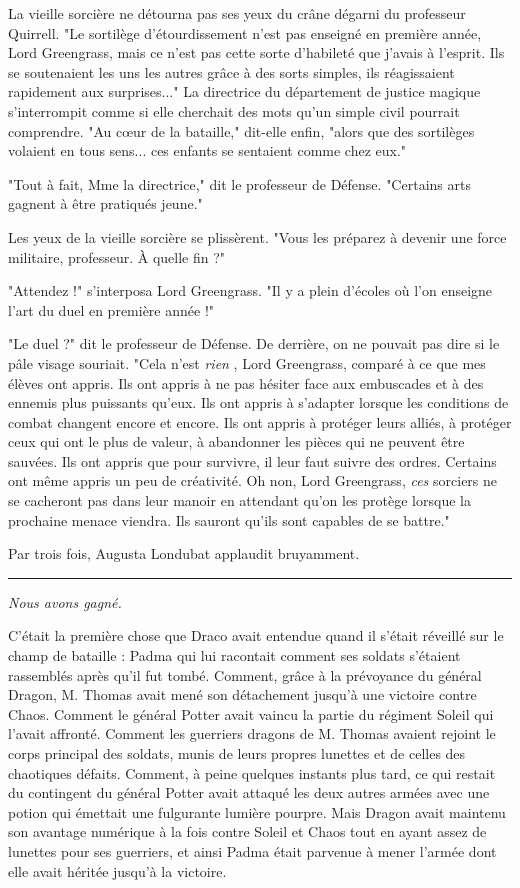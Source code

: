 La vieille sorcière ne détourna pas ses yeux du crâne dégarni du professeur Quirrell. "Le sortilège d'étourdissement n'est pas enseigné en première année, Lord Greengrass, mais ce n'est pas cette sorte d'habileté que j'avais à l'esprit. Ils se soutenaient les uns les autres grâce à des sorts simples, ils réagissaient rapidement aux surprises..." La directrice du département de justice magique s'interrompit comme si elle cherchait des mots qu'un simple civil pourrait comprendre. "Au cœur de la bataille," dit-elle enfin, "alors que des sortilèges volaient en tous sens... ces enfants se sentaient comme chez eux."

"Tout à fait, Mme la directrice," dit le professeur de Défense. "Certains arts gagnent à être pratiqués jeune."

Les yeux de la vieille sorcière se plissèrent. "Vous les préparez à devenir une force militaire, professeur. À quelle fin ?"

"Attendez !" s'interposa Lord Greengrass. "Il y a plein d'écoles où l'on enseigne l'art du duel en première année !"

"Le duel ?" dit le professeur de Défense. De derrière, on ne pouvait pas dire si le pâle visage souriait. "Cela n'est \emph{rien} , Lord Greengrass, comparé à ce que mes élèves ont appris. Ils ont appris à ne pas hésiter face aux embuscades et à des ennemis plus puissants qu'eux. Ils ont appris à s'adapter lorsque les conditions de combat changent encore et encore. Ils ont appris à protéger leurs alliés, à protéger ceux qui ont le plus de valeur, à abandonner les pièces qui ne peuvent être sauvées. Ils ont appris que pour survivre, il leur faut suivre des ordres. Certains ont même appris un peu de créativité. Oh non, Lord Greengrass, \emph{ces}  sorciers ne se cacheront pas dans leur manoir en attendant qu'on les protège lorsque la prochaine menace viendra. Ils sauront qu'ils sont capables de se battre."

Par trois fois, Augusta Londubat applaudit bruyamment.
\par\noindent\rule{\textwidth}{0.4pt}
\emph{Nous avons gagné.} 

C'était la première chose que Draco avait entendue quand il s'était réveillé sur le champ de bataille : Padma qui lui racontait comment ses soldats s'étaient rassemblés après qu'il fut tombé. Comment, grâce à la prévoyance du général Dragon, M. Thomas avait mené son détachement jusqu'à une victoire contre Chaos. Comment le général Potter avait vaincu la partie du régiment Soleil qui l'avait affronté. Comment les guerriers dragons de M. Thomas avaient rejoint le corps principal des soldats, munis de leurs propres lunettes et de celles des chaotiques défaits. Comment, à peine quelques instants plus tard, ce qui restait du contingent du général Potter avait attaqué les deux autres armées avec une potion qui émettait une fulgurante lumière pourpre. Mais Dragon avait maintenu son avantage numérique à la fois contre Soleil et Chaos tout en ayant assez de lunettes pour ses guerriers, et ainsi Padma était parvenue à mener l'armée dont elle avait héritée jusqu'à la victoire.


